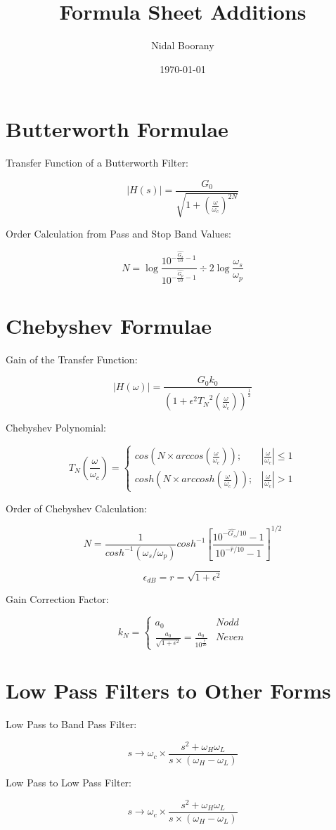 \documentclass{article}
\begin{document}
\title{Formula Sheet Additions}
\author{Nidal Boorany}
\date{\today}
\maketitle

\section{Butterworth Formulae}
Transfer Function of a Butterworth Filter:

$$|H(s)| = \frac{G_0}{\sqrt{1 + (\frac{\omega}{\omega_c})^{2N}}}$$

Order Calculation from Pass and Stop Band Values:

$$N = \log{\frac{10^{- \frac{\hat{G_s}}{10} - 1}}{10^{- \frac{\hat{G_p}}{ 10} - 1}}} \div {2 \log{\frac{\omega_s}{\omega_p}}}$$

\section{Chebyshev Formulae}

Gain of the Transfer Function:

$$|H(\omega)| = \frac{{G_0} {k_0}}{(1 + {\epsilon}^2 {T_N}^2(\frac{\omega}{\omega_c}))^{\frac{1}{2}}}$$

Chebyshev Polynomial:

$$T_N (\frac{\omega}{\omega_c}) = 
\begin{cases} 
cos(N \times arccos(\frac{\omega}{\omega_c})); & |\frac{\omega}{\omega_c}| \leqslant 1 \\
cosh(N \times arccosh(\frac{\omega}{\omega_c})); & |\frac{\omega}{\omega_c}| > 1
\end{cases}$$

Order of Chebyshev Calculation:

$$N = \frac{1}{cosh^{-1}(\omega_{s}/\omega_{p})}cosh^{-1}\left[\frac{10^{-\hat{G_{s}}/10}-1}{10^{-\hat{r}/10}-1}\right]^{1/2}$$

$$\epsilon_{dB} = r = \sqrt{1 + \epsilon^{2}}$$

Gain Correction Factor:

$$k_N = \begin{cases} 
    a_0 & N odd\\ 
    \frac{a_0}{\sqrt{1+ \epsilon^2}} = \frac{a_0}{10^{\frac{\hat{r}}{20}}} & N even
\end{cases}
$$

\section{Low Pass Filters to Other Forms}

Low Pass to Band Pass Filter:

$$s \rightarrow \omega_c \times \frac{s^2 + \omega_H \omega_L}{s\times (\omega_H - \omega_L)}$$

Low Pass to Low Pass Filter:

$$s \rightarrow \omega_c \times \frac{s^2+\omega_H \omega_L}{s \times(\omega_H - \omega_L)}$$
\end{document}
